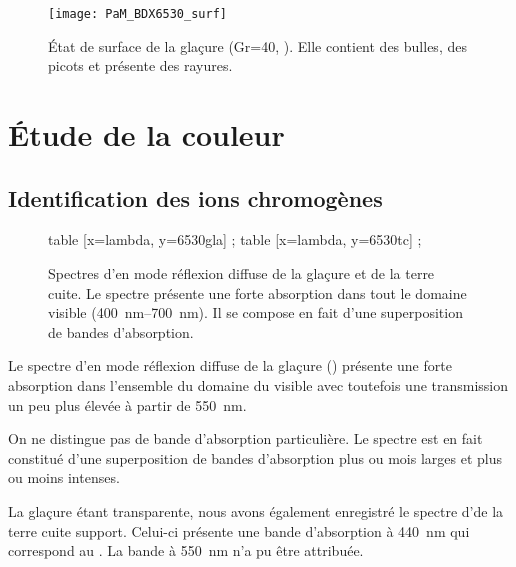\begin{figure}[htb]
  \texttt{[image: PaM\_BDX6530\_surf]}
  \caption{\legendeC 
           État de surface de la glaçure (Gr=\num{40}, ). Elle contient des 
           bulles, des picots et présente des rayures.}
  \label{surf:6530}
\end{figure}


\section{Étude de la couleur}

\subsection{Identification des ions chromogènes}
\begin{figure}[htb]
  \begin{plotspectre}
       table [x=lambda, y=6530gla] {\gladata} ;
       table [x=lambda, y=6530tc] {\tcdata} ;
  \end{plotspectre}
  \caption{\legendeC 
           Spectres d'\AO en mode réflexion diffuse de la glaçure et de la terre cuite. Le spectre présente une forte absorption dans tout le domaine visible (\SIrange{400}{700}{\nm}). Il se compose en fait d'une superposition de bandes d'absorption.}
  \label{spectre:6530}
\end{figure}

Le spectre d'\AO en mode réflexion diffuse de la glaçure () présente une forte absorption dans l'ensemble du domaine du visible avec toutefois une transmission un peu plus élevée à partir de \SI{550}{\nm}.

On ne distingue pas de bande d'absorption particulière. Le spectre est 
en fait constitué d'une superposition de bandes d'absorption plus ou 
mois larges et plus ou moins intenses.

La glaçure étant transparente, nous avons également enregistré le spectre d'\AO de la terre cuite support. Celui-ci présente une bande d'absorption à \SI{440}{\nm} qui correspond au  \autocite{Lajarte_1979}. La bande à \SI{550}{\nm} n'a pu être attribuée.

